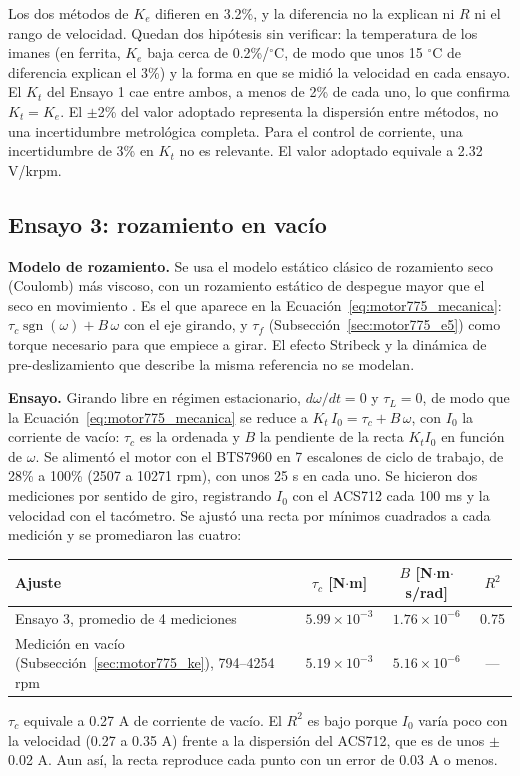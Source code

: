 Los dos métodos de $K_e$ difieren en 3.2\%, y la diferencia no la explican ni $R$ ni el rango de velocidad. Quedan dos hipótesis sin verificar: la temperatura de los imanes (en ferrita, $K_e$ baja cerca de 0.2\%/$^\circ$C, de modo que unos 15 $^\circ$C de diferencia explican el 3\%) y la forma en que se midió la velocidad en cada ensayo. El $K_t$ del Ensayo 1 cae entre ambos, a menos de 2\% de cada uno, lo que confirma $K_t = K_e$. El $\pm$2\% del valor adoptado representa la dispersión entre métodos, no una incertidumbre metrológica completa. Para el control de corriente, una incertidumbre de 3\% en $K_t$ no es relevante. El valor adoptado equivale a 2.32 V/krpm.

\subsection{Ensayo 3: rozamiento en vacío}
\label{sec:motor775_e3}
\textbf{Modelo de rozamiento.} Se usa el modelo estático clásico de rozamiento seco (Coulomb) más viscoso, con un rozamiento estático de despegue mayor que el seco en movimiento \cite{armstrong1994}. Es el que aparece en la Ecuación~\eqref{eq:motor775_mecanica}: $\tau_c\operatorname{sgn}(\omega) + B\,\omega$ con el eje girando, y $\tau_f$ (Subsección~\ref{sec:motor775_e5}) como torque necesario para que empiece a girar. El efecto Stribeck y la dinámica de pre-deslizamiento que describe la misma referencia no se modelan.

\textbf{Ensayo.} Girando libre en régimen estacionario, $d\omega/dt = 0$ y $\tau_L = 0$, de modo que la Ecuación~\eqref{eq:motor775_mecanica} se reduce a $K_t\,I_0 = \tau_c + B\,\omega$, con $I_0$ la corriente de vacío: $\tau_c$ es la ordenada y $B$ la pendiente de la recta $K_t I_0$ en función de $\omega$. Se alimentó el motor con el BTS7960 en 7 escalones de ciclo de trabajo, de 28\% a 100\% (2507 a 10271 rpm), con unos 25 s en cada uno. Se hicieron dos mediciones por sentido de giro, registrando $I_0$ con el ACS712 cada 100 ms y la velocidad con el tacómetro. Se ajustó una recta por mínimos cuadrados a cada medición y se promediaron las cuatro:
\begin{center}
\begin{tabular}{lccc}\toprule
Ajuste & $\tau_c$ [N$\cdot$m] & $B$ [N$\cdot$m$\cdot$s/rad] & $R^2$\\\midrule
Ensayo 3, promedio de 4 mediciones & $5.99\times10^{-3}$ & $1.76\times10^{-6}$ & 0.75\\
Medición en vacío (Subsección~\ref{sec:motor775_ke}), 794--4254 rpm & $5.19\times10^{-3}$ & $5.16\times10^{-6}$ & ---\\\bottomrule
\end{tabular}
\end{center}
$\tau_c$ equivale a 0.27 A de corriente de vacío. El $R^2$ es bajo porque $I_0$ varía poco con la velocidad (0.27 a 0.35 A) frente a la dispersión del ACS712, que es de unos $\pm$0.02 A. Aun así, la recta reproduce cada punto con un error de 0.03 A o menos.

